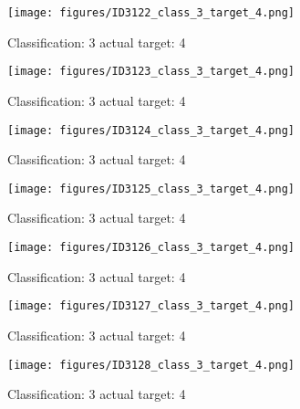 \begin{figure}[h!]
\begin{center}
\texttt{[image: figures/ID3122\_class\_3\_target\_4.png]}
\end{center}
\caption{ Classification: 3 actual target: 4}
\label{fig:ID3122_class_3_target_4}
\end{figure}
\begin{figure}[h!]
\begin{center}
\texttt{[image: figures/ID3123\_class\_3\_target\_4.png]}
\end{center}
\caption{ Classification: 3 actual target: 4}
\label{fig:ID3123_class_3_target_4}
\end{figure}
\begin{figure}[h!]
\begin{center}
\texttt{[image: figures/ID3124\_class\_3\_target\_4.png]}
\end{center}
\caption{ Classification: 3 actual target: 4}
\label{fig:ID3124_class_3_target_4}
\end{figure}
\begin{figure}[h!]
\begin{center}
\texttt{[image: figures/ID3125\_class\_3\_target\_4.png]}
\end{center}
\caption{ Classification: 3 actual target: 4}
\label{fig:ID3125_class_3_target_4}
\end{figure}
\begin{figure}[h!]
\begin{center}
\texttt{[image: figures/ID3126\_class\_3\_target\_4.png]}
\end{center}
\caption{ Classification: 3 actual target: 4}
\label{fig:ID3126_class_3_target_4}
\end{figure}
\begin{figure}[h!]
\begin{center}
\texttt{[image: figures/ID3127\_class\_3\_target\_4.png]}
\end{center}
\caption{ Classification: 3 actual target: 4}
\label{fig:ID3127_class_3_target_4}
\end{figure}
\begin{figure}[h!]
\begin{center}
\texttt{[image: figures/ID3128\_class\_3\_target\_4.png]}
\end{center}
\caption{ Classification: 3 actual target: 4}
\label{fig:ID3128_class_3_target_4}
\end{figure}
